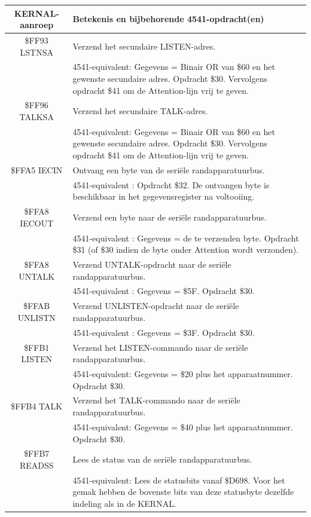 \begin{center}
    \small{
    \begin{longtable}{|c|L{9cm}|}
        \hline
        \textbf{KERNAL-aanroep} & \textbf{Betekenis en bijbehorende 4541-opdracht(en)}\\
        \hline
        \endhead
        \$FF93 LSTNSA & Verzend het secundaire LISTEN-adres.  \\         & 4541-equivalent: Gegevens = Binair OR van \$60 en het gewenste        secundaire adres.  Opdracht \$30. Vervolgens opdracht \$41 om de        Attention-lijn vrij te geven. \\
        \hline
        \$FF96 TALKSA & Verzend het secundaire TALK-adres.  \\         & 4541-equivalent: Gegevens = Binair OR van \$60 en het gewenste        secundaire adres.  Opdracht \$30. Vervolgens opdracht \$41 om de        Attention-lijn vrij te geven. \\
        \hline
        \$FFA5 IECIN & Ontvang een byte van de seriële randapparatuurbus.  \\         & 4541-equivalent : Opdracht \$32. De ontvangen byte is beschikbaar        in het gegevensregister na voltooiing.  \\
        \hline
        \$FFA8 IECOUT & Verzend een byte naar de seriële randapparatuurbus.  \\         & 4541-equivalent : Gegevens = de te verzenden byte. Opdracht \$31 (of \$30 indien de byte        onder Attention wordt verzonden). \\
        \hline
        \$FFA8 UNTALK  & Verzend UNTALK-opdracht naar de seriële randapparatuurbus.  \\        & 4541-equivalent : Gegevens = \$5F. Opdracht \$30. \\
        \hline
        \$FFAB UNLISTN  & Verzend UNLISTEN-opdracht naar de seriële randapparatuurbus.  \\        & 4541-equivalent : Gegevens = \$3F. Opdracht \$30. \\
        \hline
        \$FFB1 LISTEN  & Verzend het LISTEN-commando naar de seriële randapparatuurbus.  \\        & 4541-equivalent: Gegevens = \$20 plus het apparaatnummer. Opdracht \$30. \\
        \hline
        \$FFB4 TALK  & Verzend het TALK-commando naar de seriële randapparatuurbus.  \\        & 4541-equivalent: Gegevens = \$40 plus het apparaatnummer. Opdracht \$30. \\
        \hline
        \$FFB7 READSS & Lees de status van de seriële randapparatuurbus.  \\        & 4541-equivalent: Lees de statusbits vanaf \$D698. Voor        het gemak hebben de        bovenste bits van deze statusbyte dezelfde indeling als in        de KERNAL. \\
        \hline
    \end{longtable}
    }
\end{center}

